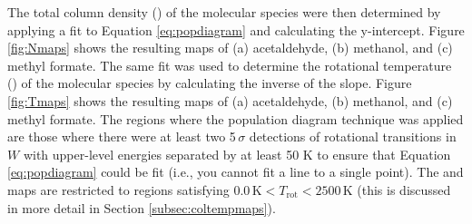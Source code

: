 \documentclass[iop,twocolappendix]{emulateapj}
\begin{document}
The total column density (\Ntot) of the molecular species were then determined by applying a fit to Equation \ref{eq:popdiagram} and calculating the y-intercept. Figure \ref{fig:Nmaps} shows the resulting {\Ntot} maps of (a) acetaldehyde, (b) methanol, and (c) methyl formate. The same fit was used to determine the rotational temperature (\Trot) of the molecular species by calculating the inverse of the slope. Figure \ref{fig:Tmaps} shows the resulting {\Trot} maps of (a) acetaldehyde, (b) methanol, and (c) methyl formate. The regions where the population diagram technique was applied are those where there were at least two 5\,$\sigma$ detections of rotational transitions in $W$ with upper-level energies separated by at least 50 K to ensure that Equation \ref{eq:popdiagram} could be fit (i.e., you cannot fit a line to a single point). The {\Trot} and {\Ntot} maps are restricted to regions satisfying $0.0 \, \mathrm{K} < T_\mathrm{rot} < 2500 \, \mathrm{K}$ (this is discussed in more detail in Section \ref{subsec:coltempmaps}).
\end{document}
